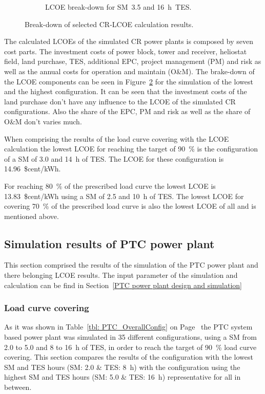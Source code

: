 \begin{figure}[!htbp]
\begin{subfigure}[b]{0.5\textwidth}
                \caption{LCOE break-down for SM~3.5 and 16~h~TES.}\label{CR_LCOE_highinvest_BreakDown}
        \end{subfigure}
        \caption[Break-down of selected CR-LCOE calculation results.]{Break-down of selected CR-LCOE calculation results.}\label{CR_LCOE_BreakDown}
\end{figure}
The calculated LCOEs of the simulated CR power plants is composed by seven cost parts. The investment costs of power block, tower and receiver, heliostat field, land purchase, TES, additional EPC, project management (PM) and risk as well as the annual costs for operation and maintain (O\&M). The brake-down of the LCOE components can be seen in Figure~\ref{CR_LCOE_BreakDown} for the simulation of the lowest and the highest configuration.  It can be seen that the investment costs of the land purchase don't have any influence to the LCOE of the simulated CR configurations. Also the share of the EPC, PM and risk as well as the share of O\&M don't varies much.

When comprising the results of the load curve covering with the LCOE calculation the lowest LCOE for reaching the target of 90~\% is the configuration of a SM of 3.0 and 14~h of TES. The LCOE for these configuration is 14.96~\$cent/kWh. 

For reaching 80~\% of the prescribed load curve the lowest LCOE is 13.83~\$cent/kWh using a SM of 2.5 and 10~h of TES. The lowest LCOE for covering 70~\% of the prescribed load curve is also the lowest LCOE of all and is mentioned above.
\subsection{Simulation results of PTC power plant}
This section comprised the results of the simulation of the PTC power plant and there belonging LCOE results. The input parameter of the simulation and calculation can be find in Section~\ref{PTC power plant design  and simulation}
\subsubsection{Load curve covering}
As it was shown in Table~\ref{tbl: PTC_OverallConfig} on Page~\pageref{tbl: PTC_OverallConfig} the PTC system based power plant was simulated in 35 different configurations, using a SM from 2.0 to 5.0 and 8 to 16~h of TES, in order to reach the target of 90~\% load curve covering. This section compares the results of the configuration with the lowest SM and TES hours (SM: 2.0 \& TES: 8~h) with the configuration using the highest SM and TES hours  (SM: 5.0 \& TES: 16~h) representative for all in between.  

